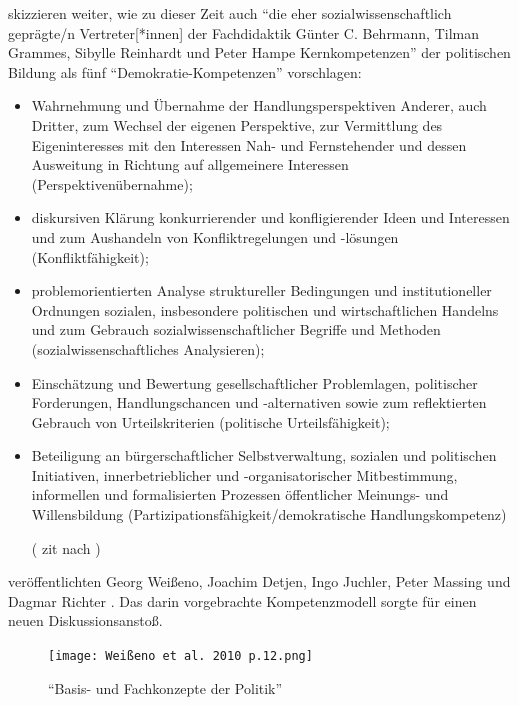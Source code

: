 \textcite[106-107]{Gloe2020} skizzieren weiter, wie zu dieser Zeit auch 
\enquote{die eher sozialwissenschaftlich geprägte/n Vertreter[*innen] der Fachdidaktik Günter C. Behrmann, Tilman Grammes, Sibylle Reinhardt und Peter Hampe Kernkompetenzen} der politischen Bildung als fünf \enquote{Demokratie-Kompetenzen} vorschlagen:
\begin{itemize}
    \item Wahrnehmung und Übernahme der Handlungsperspektiven Anderer, auch Dritter, zum Wechsel der eigenen Perspektive, zur Vermittlung des Eigeninteresses mit den Interessen Nah- und Fernstehender und dessen Ausweitung in Richtung auf allgemeinere Interessen (Perspektivenübernahme); 
    \item diskursiven Klärung konkurrierender und konfligierender Ideen und Interessen und zum Aushandeln von Konfliktregelungen und -lösungen (Konfliktfähigkeit); 
    \item problemorientierten Analyse struktureller Bedingungen und institutioneller Ordnungen sozialen, insbesondere politischen und wirtschaftlichen Handelns und zum Gebrauch sozialwissenschaftlicher Begriffe und Methoden (sozialwissenschaftliches Analysieren); 
    \item Einschätzung und Bewertung gesellschaftlicher Problemlagen, politischer Forderungen, Handlungschancen und -alternativen sowie zum reflektierten Gebrauch von Urteilskriterien (politische Urteilsfähigkeit); 
    \item Beteiligung an bürgerschaftlicher Selbstverwaltung, sozialen und politischen Initiativen, innerbetrieblicher und -organisatorischer Mitbestimmung, informellen und formalisierten Prozessen öffentlicher Meinungs- und Willensbildung (Partizipationsfähigkeit/demokratische Handlungskompetenz) 

    (\textcite[337 f.]{Behrmann.2004} \gls{zit} nach \textcite[106-107]{Gloe2020})
\end{itemize}
\citeyear{weißeno.2010} veröffentlichten Georg Weißeno, Joachim Detjen, Ingo Juchler, Peter Massing und Dagmar Richter . Das darin vorgebrachte Kompetenzmodell %
sorgte für einen neuen Diskussionsanstoß. 
\begin{figure}[htb]
    \centering
    \texttt{[image: Weißeno et al. 2010 p.12.png]}
    \caption{\enquote{Basis- und Fachkonzepte der Politik} \autocite[12]{weißeno.2010}}
    \label{2010kompMod}
\end{figure}
